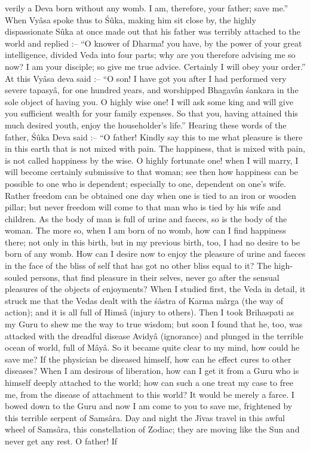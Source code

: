 verily a Deva born without any womb. I am, therefore, your father; save me.'' When Vy\^asa spoke thus to \'S\^uka, making him sit close by, the highly dispassionate S\^uka at once made out that his father was terribly attached to the world and replied :-- ``O knower of Dharma! you have, by the power of your great intelligence, divided Veda into four parts; why are you therefore advising me so now? I am your disciple; so give me true advice. Certainly I will obey your order.'' At this Vy\^asa deva said :-- ``O son! I have got you after I had performed very severe tapasy\^a, for one hundred years, and worshipped Bhagav\^an \'sankara in the sole object of having you. O highly wise one! I will ask some king and will give you sufficient wealth for your family expenses. So that you, having attained this much desired youth, enjoy the householder's life.'' Hearing these words of the father, \'S\^uka Deva said :-- ``O father! Kindly say this to me what pleasure is there in this earth that is not mixed with pain. The happiness, that is mixed with pain, is not called happiness by the wise. O highly fortunate one! when I will marry, I will become certainly submissive to that woman; see then how happiness can be possible to one who is dependent; especially to one, dependent on one's wife. Rather freedom can be obtained one day when one is tied to an iron or wooden pillar; but never freedom will come to that man who is tied by his wife and children. As the body of man is full of urine and faeces, so is the body of the woman. The more so, when I am born of no womb, how can I find happiness there; not only in this birth, but in my previous birth, too, I had no desire to be born of any womb. How can I desire now to enjoy the pleasure of urine and faeces in the face of the bliss of self that has got no other bliss equal to it? The high-souled persons, that find pleasure in their selves, never go after the sensual pleasures of the objects of enjoyments? When I studied first, the Veda in detail, it struck me that the Vedas dealt with the \'s\^astra of Karma m\^arga (the way of action); and it is all full of Hims\^a (injury to others). Then I took Brihaspati as my Guru to shew me the way to true wisdom; but soon I found that he, too, was attacked with the dreadful disease Avidy\^a (ignorance) and plunged in the terrible ocean of world, full of M\^ay\^a. So it became quite clear to my mind, how could he save me? If the physician be diseased himself, how can he effect cures to other diseases? When I am desirous of liberation, how can I get it from a Guru who is himself deeply attached to the world; how can such a one treat my case to free me, from the disease of attachment to this world? It would be merely a farce. I bowed down to the Guru and now I am come to you to save me, frightened by this terrible serpent of Sams\^ara. Day and night the J\^ivas travel in this awful wheel of Sams\^ara, this constellation of Zodiac; they are moving like the Sun and never get any rest. O father! If

